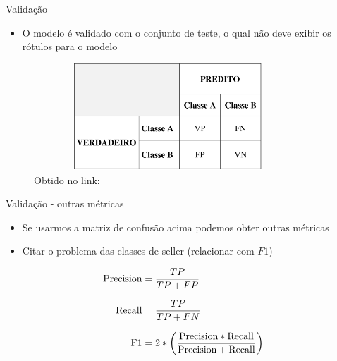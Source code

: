 \begin{frame}	
	\begin{block}{Validação}	
		\begin{itemize}
			\item O modelo é validado com o conjunto de teste, o qual não deve exibir os rótulos para o modelo
		\end{itemize}
				\begin{figure}[!htb]
			\centering	  				
			\includegraphics[height=4cm, width = 10cm]{./pic/matrizConfusao.png}
			\caption{Obtido no link: \href{http://www.scielo.br/pdf/eagri/v33n6/19.pdf}{\color{blue}{Scielo} }}	
			\label{fig_matriz_confusao}
		\end{figure}	
	\end{block}
\end{frame}

\begin{frame}	
	\begin{block}{Validação - outras métricas}	
		\begin{itemize}
			\item Se usarmos a matriz de confusão acima podemos obter outras métricas
			\item Citar o problema das classes de seller (relacionar com $F1$)
		\end{itemize}
		\begin{equation*}
			\setlength{\jot}{10pt}
				\begin{aligned}
					\textrm{Precision} &= \frac{TP}{TP + FP} \\
					\textrm{Recall} &= \frac{TP}{TP + FN} \\
					\textrm{F1} &= 2 * \left(  \frac{\textrm{Precision}  * \textrm{Recall}}{\textrm{Precision}  + \textrm{Recall}} \right)
				\end{aligned}
		\end{equation*}
	\end{block}
\end{frame}